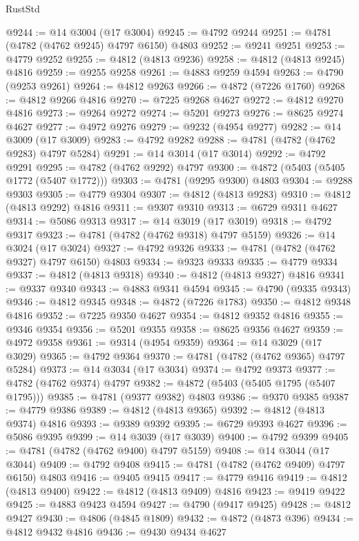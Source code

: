 \begin{lexlean}{RustStd}
\begin{coremodule}
@9244 := @14 @3004 (@17 @3004)
@9245 := @4792 @9244
@9251 := @4781 (@4782 (@4762 @9245) @4797 @6150) @4803
@9252 := @9241 @9251
@9253 := @4779 @9252
@9255 := @4812 (@4813 @9236)
@9258 := @4812 (@4813 @9245) @4816
@9259 := @9255 @9258
@9261 := @4883 @9259 @4594
@9263 := @4790 (@9253 @9261)
@9264 := @4812 @9263
@9266 := @4872 (@7226 @1760)
@9268 := @4812 @9266 @4816
@9270 := @7225 @9268 @4627
@9272 := @4812 @9270 @4816
@9273 := @9264 @9272
@9274 := @5201 @9273
@9276 := @8625 @9274 @4627
@9277 := @4972 @9276
@9279 := @9232 (@4954 @9277)
@9282 := @14 @3009 (@17 @3009)
@9283 := @4792 @9282
@9288 := @4781 (@4782 (@4762 @9283) @4797 @5284)
@9291 := @14 @3014 (@17 @3014)
@9292 := @4792 @9291
@9295 := @4782 (@4762 @9292) @4797
@9300 := @4872 (@5403 (@5405 @1772 (@5407 @1772)))
@9303 := @4781 (@9295 @9300) @4803
@9304 := @9288 @9303
@9305 := @4779 @9304
@9307 := @4812 (@4813 @9283)
@9310 := @4812 (@4813 @9292) @4816
@9311 := @9307 @9310
@9313 := @6729 @9311 @4627
@9314 := @5086 @9313
@9317 := @14 @3019 (@17 @3019)
@9318 := @4792 @9317
@9323 := @4781 (@4782 (@4762 @9318) @4797 @5159)
@9326 := @14 @3024 (@17 @3024)
@9327 := @4792 @9326
@9333 := @4781 (@4782 (@4762 @9327) @4797 @6150) @4803
@9334 := @9323 @9333
@9335 := @4779 @9334
@9337 := @4812 (@4813 @9318)
@9340 := @4812 (@4813 @9327) @4816
@9341 := @9337 @9340
@9343 := @4883 @9341 @4594
@9345 := @4790 (@9335 @9343)
@9346 := @4812 @9345
@9348 := @4872 (@7226 @1783)
@9350 := @4812 @9348 @4816
@9352 := @7225 @9350 @4627
@9354 := @4812 @9352 @4816
@9355 := @9346 @9354
@9356 := @5201 @9355
@9358 := @8625 @9356 @4627
@9359 := @4972 @9358
@9361 := @9314 (@4954 @9359)
@9364 := @14 @3029 (@17 @3029)
@9365 := @4792 @9364
@9370 := @4781 (@4782 (@4762 @9365) @4797 @5284)
@9373 := @14 @3034 (@17 @3034)
@9374 := @4792 @9373
@9377 := @4782 (@4762 @9374) @4797
@9382 := @4872 (@5403 (@5405 @1795 (@5407 @1795)))
@9385 := @4781 (@9377 @9382) @4803
@9386 := @9370 @9385
@9387 := @4779 @9386
@9389 := @4812 (@4813 @9365)
@9392 := @4812 (@4813 @9374) @4816
@9393 := @9389 @9392
@9395 := @6729 @9393 @4627
@9396 := @5086 @9395
@9399 := @14 @3039 (@17 @3039)
@9400 := @4792 @9399
@9405 := @4781 (@4782 (@4762 @9400) @4797 @5159)
@9408 := @14 @3044 (@17 @3044)
@9409 := @4792 @9408
@9415 := @4781 (@4782 (@4762 @9409) @4797 @6150) @4803
@9416 := @9405 @9415
@9417 := @4779 @9416
@9419 := @4812 (@4813 @9400)
@9422 := @4812 (@4813 @9409) @4816
@9423 := @9419 @9422
@9425 := @4883 @9423 @4594
@9427 := @4790 (@9417 @9425)
@9428 := @4812 @9427
@9430 := @4806 (@4845 @1809)
@9432 := @4872 (@4873 @396)
@9434 := @4812 @9432 @4816
@9436 := @9430 @9434 @4627

\end{coremodule}
\end{lexlean}
